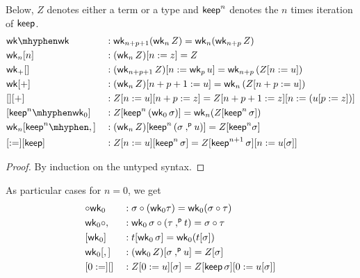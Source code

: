 \begin{lemma}\label{lem:exch-laws}
  Below, $Z$ denotes either a term or a type and $\mathsf{keep}^n$ denotes
  the $n$ times iteration of $\mathsf{keep}$.
\begin{alignat*}{5}
  & \wk\mhyphen\wk && : \wk_{n+p+1} (\wk_n\,Z) = \wk_n(\wk_{n+p}\,Z)\\
  & \wk_n[n] && : (\wk_{n}\,Z)[ n := z] = Z \\
  & \wk_+[] && : (\wk_{n+p+1}\,Z)[ n := \wk_p\,u] = \wk_{n+p}\,(Z[n := u]) \\
  & \wk[+] && : (\wk_{n}\,Z)[ n+p+1 :=  u] = \wk_{n}\,(Z[n+p := u]) \\
  & [][+] && : Z[n :=u][n+p:=z] = Z[n+p+1:=z][n:= (u[p:=z])] \\
  & [\keep^n\mhyphen \wkO] && : Z[\keep^n\,(\wkO\,\sigma)] = \wk_n (Z[\keep^n\,\sigma])
  \\
  & \wk_n[\keep^n\mhyphen\cons]  & &
  :
  (\wk_n\,Z) [\keep^n\, (\sigma \consu u)] = Z [ \keep^n \sigma]
  \\
   & [:=][\keep] && : Z [ n:= u][\keep^n\,\sigma] =  Z[\keep^{n+1}\,\sigma][n := u[\sigma]]
  \end{alignat*}
\end{lemma}
\begin{proof}
By induction on the untyped syntax.
\end{proof}

\begin{corollary}
As particular cases for $n=0$, we get
\begin{alignat*}{5}
  & {}{\circ}{}\mathsf{wk}_0 & & : \sigma \circ (\mathsf{wk}_0 \tau) = \mathsf{wk}_0 (\sigma \circ \tau) \\
  & \mathsf{wk}_0{}{\circ}{}, && : \mathsf{wk}_0\,\sigma \circ (\tau \mathbin{{,}^{\mathsf{p}}} t) = \sigma \circ \tau \\
  & [\mathsf{wk}_0] && : t[\mathsf{wk}_0\,\sigma] = \mathsf{wk}_0 (t[\sigma]) \\
  & \mathsf{wk}_0[,] && : (\mathsf{wk}_0\,Z)[\sigma \mathbin{{,}^{\mathsf{p}}} u] = Z[\sigma] \\
  & [0:=][] && : Z [ 0:= u][\sigma] =  Z[\mathsf{keep}\,\sigma][0 := u[\sigma]]
\end{alignat*}
\end{corollary}

